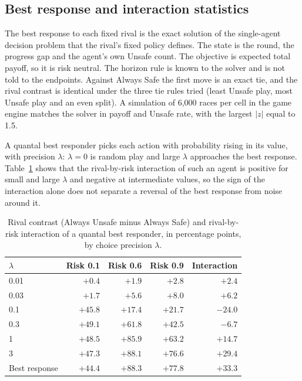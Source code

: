 \documentclass{article}
\begin{document}
\subsection{Best response and interaction statistics}
\label{app:best-response}

The best response to each fixed rival is the exact solution of the single-agent
decision problem that the rival's fixed policy defines. The state is the round,
the progress gap and the agent's own Unsafe count. The objective is expected
total payoff, so it is risk neutral. The horizon rule is known to the solver and
is not told to the endpoints. Against Always Safe the first move is an exact tie,
and the rival contrast is identical under the three tie rules tried (least
Unsafe play, most Unsafe play and an even split). A simulation of 6{,}000 races per
cell in the game engine matches the solver in payoff and Unsafe rate, with the
largest $|z|$ equal to 1.5.

A quantal best responder picks each action with probability rising in its value,
with precision $\lambda$: $\lambda=0$ is random play and large $\lambda$ approaches the
best response. Table~\ref{tab:quantal} shows that the rival-by-risk interaction
of such an agent is positive for small and large $\lambda$ and negative at
intermediate values, so the sign of the interaction alone does not separate a
reversal of the best response from noise around it.

\begin{table}[t]
\caption{Rival contrast (Always Unsafe minus Always Safe) and rival-by-risk
interaction of a quantal best responder, in percentage points, by choice
precision $\lambda$.}
\label{tab:quantal}
\centering
\small
\begin{tabular}{@{}lrrrr@{}}
\toprule
$\lambda$ & Risk 0.1 & Risk 0.6 & Risk 0.9 & Interaction \\
\midrule
0.01 & $+0.4$ & $+1.9$ & $+2.8$ & $+2.4$ \\
0.03 & $+1.7$ & $+5.6$ & $+8.0$ & $+6.2$ \\
0.1 & $+45.8$ & $+17.4$ & $+21.7$ & $-24.0$ \\
0.3 & $+49.1$ & $+61.8$ & $+42.5$ & $-6.7$ \\
1 & $+48.5$ & $+85.9$ & $+63.2$ & $+14.7$ \\
3 & $+47.3$ & $+88.1$ & $+76.6$ & $+29.4$ \\
Best response & $+44.4$ & $+88.3$ & $+77.8$ & $+33.3$ \\
\bottomrule
\end{tabular}
\end{table}
\end{document}

